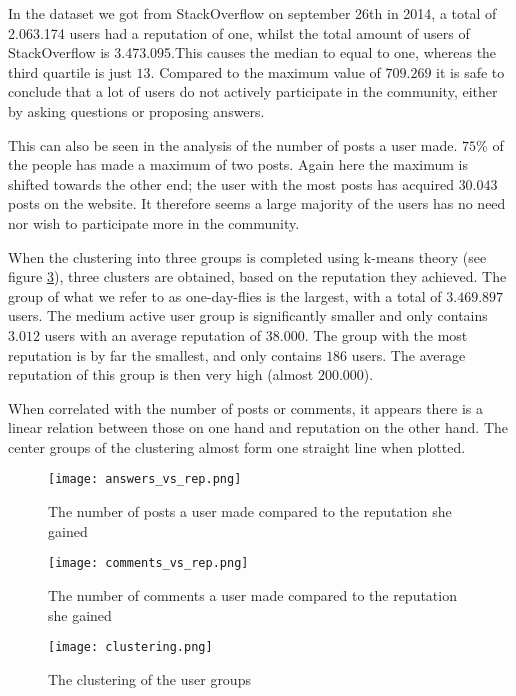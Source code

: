 \documentclass[conference]{IEEEtran}
\begin{document}
In the dataset we got from StackOverflow on september 26th in 2014, a total of
2.063.174 users had a reputation of one, whilst the total amount of users of
StackOverflow is 3.473.095.This causes the median to  equal to one, whereas the
third quartile is just $13$. Compared to the maximum value of $709.269$ it is
safe to conclude that a lot of users do not actively participate in the
community, either by asking questions or proposing answers.

This can also be seen in the analysis of the number of posts a user made.
$75\%$ of the people has made a maximum of two posts. Again here the maximum is
shifted towards the other end; the user with the most posts has acquired
$30.043$ posts on the website. It therefore seems a large majority of the users
has no need nor wish to participate more in the community.

When the clustering into three groups is completed using k-means theory (see
figure \ref{kmeans_clustering}), three clusters are obtained, based on the
reputation they achieved. The group of what we refer to as one-day-flies is the
largest, with a total of $3.469.897$ users. The medium active user group is
significantly smaller and only contains $3.012$ users with an average
reputation of $38.000$. The group with the most reputation is by far the
smallest, and only contains $186$ users. The average reputation of this group
is then very high (almost $200.000$).

When correlated with the number of posts or comments, it appears there is a
linear relation between those on one hand and reputation on the other hand. The
center groups of the clustering almost form one straight line when plotted.

\begin{figure}[h]
 \texttt{[image: answers\_vs\_rep.png]}
 \caption{The number of posts a user made compared to the reputation she gained}
 \label{answers_vs_rep}
\end{figure}

\begin{figure}[h]
 \texttt{[image: comments\_vs\_rep.png]}
 \caption{The number of comments a user made compared to the reputation she gained}
 \label{comments_vs_rep}
\end{figure}

\begin{figure}[h]
 \texttt{[image: clustering.png]}
 \caption{The clustering of the user groups}
 \label{kmeans_clustering}
\end{figure}
\end{document}

